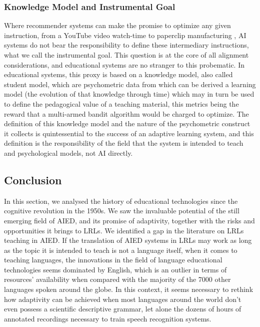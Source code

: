         \subsubsection{Knowledge Model and Instrumental Goal}
Where recommender systems can make the promise to optimize any given instruction, from a YouTube video watch-time to paperclip manufacturing \parencite{bostrom_ethical_2003}, AI systems do not bear the responsibility to define these intermediary instructions, what we call the instrumental goal. This question is at the core of all alignment considerations, and educational systems are no stranger to this probematic. In educational systems, this proxy is based on a knowledge model, also called student model, which are psychometric data from which can be derived a learning model (the evolution of that knowledge through time) which may in turn be used to define the pedagogical value of a teaching material, this metrics being the reward that a multi-armed bandit algorithm would be charged to optimize. The definition of this knowledge model and the nature of the psychometric construct it collects is quintessential to the success of an adaptive learning system, and this definition is the responsibility of the field that the system is intended to teach and psychological models, not AI directly. \\

    \subsection{Conclusion}
In this section, we analysed the history of educational technologies since the cognitive revolution in the 1950s. We saw the invaluable potential of the still emerging field of AIED, and its promise of adaptivity, together with the risks and opportunities it brings to LRLs. We identified a gap in the literature on LRLs teaching in AIED. If the translation of AIED systems in LRLs may work as long as the topic it is intended to teach is not a language itself, when it comes to teaching languages, the innovations in the field of language educational technologies seems dominated by English, which is an outlier in terms of resources' availability when compared with the majority of the 7000 other languages spoken around the globe. In this context, it seems necessary to rethink how adaptivity can be achieved when most languages around the world don't even possess a scientific descriptive grammar, let alone the dozens of hours of annotated recordings necessary to train speech recognition systems.


